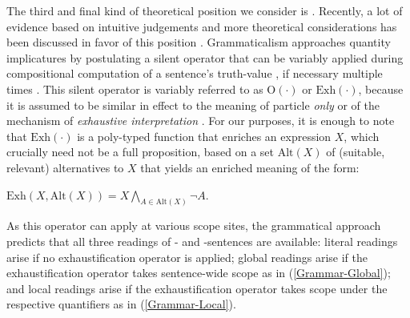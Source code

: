\documentclass[fleqn,reqno,10pt,draft]{article}
\newcommand{\as}{\acro{as}}
\renewcommand{\es}{\acro{es}}
\newcommand{\exh}{\ensuremath{\mathrm{Exh}}}
\newcommand{\alt}{\ensuremath{\mathrm{Alt}}}
\begin{document}
The third and final kind of theoretical position we consider is
. Recently, a lot of evidence based on
intuitive judgements and more theoretical considerations has been
discussed in favor of this position
\citep[c.f.][]{Chierchia2006:Broaden-Your-Vi,Fox2007:Free-Choice-and,Magri2011:Another-Argumen,Sauerland2012:The-Computation,ChierchiaFox2008:The-Grammatical,Chierchia2012:FC-Nominals-and}. %
Grammaticalism approaches quantity implicatures by postulating a
silent operator that can be variably applied during compositional
computation of a sentence's truth-value
\citep{Chierchia2006:Broaden-Your-Vi}, if necessary multiple times
\citep{Fox2007:Free-Choice-and}. This silent operator is variably
referred to as $\mathrm{O}(\cdot)$ or $\exh(\cdot)$, because it is
assumed to be similar in effect to the meaning of particle \emph{only}
or of the mechanism of \emph{exhaustive interpretation}
\citep{GroenendijkStokhofThesis1984,Stechowvon-StechowZimmermann1984:Term-Answers-an,Rooijvan-RooijSchulz2013:Exhaustive-Inte,vanRooijSchulz:ExhaustiveInterpretation,Fox2007:Free-Choice-and}. For
our purposes, it is enough to note that $\exh(\cdot)$ is a
poly-typed function that enriches an expression $X$, which crucially
need not be a full proposition, based on a set $\alt(X)$ of
(suitable, relevant) alternatives to $X$ that yields an enriched
meaning of the form:
\begin{exe}
  \ex \label{bsp:Exh-Def} $\exh(X,\alt(X)) = X \bigwedge_{A \in
      \alt(X)} \neg A$.
\end{exe}

As this operator can apply at various scope sites, the grammatical
approach predicts that all three readings of \as- and \es-sentences
are available: literal readings arise if no exhaustification operator
is applied; global readings arise if the exhaustification operator
takes sentence-wide scope as in (\ref{Grammar-Global}); and local
readings arise if the exhaustification operator takes scope under the
respective quantifiers as in (\ref{Grammar-Local}).
\end{document}
